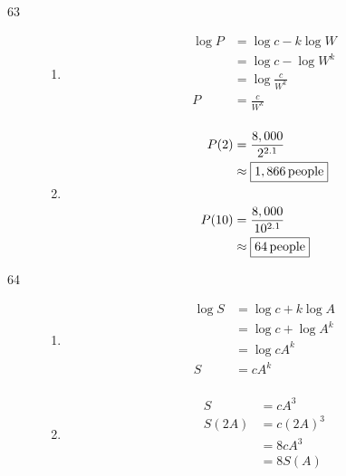 \documentclass{exam}
\begin{document}
\begin{description}
      \item[63]
        \begin{enumerate}[a]
          \item 
            \begin{align*}
              \log P &= \log c - k \log W \\
                     &= \log c - \log W^k \\
                     &= \log \frac{c}{W^k} \\
                   P &= \boxed{\frac{c}{W^k}} \\
            \end{align*}

          \item
            \begin{align*}
              P(2)  & = \frac{8,000}{2^{2.1}} \\
                    & \approx \boxed{\unit[1,866]{people}} \\
              \\
              P(10) & = \frac{8,000}{10^{2.1}} \\
                    & \approx \boxed{\unit[64]{people}} \\
            \end{align*}

        \end{enumerate}

      \item[64]
        \begin{enumerate}[a]
          \item 
            \begin{align*}
              \log S &= \log c + k \log A \\
                     &= \log c + \log A^k \\
                     &= \log cA^k \\
                   S &= \boxed{cA^k} \\
            \end{align*}

          \item
            \begin{align*}
              S     &= cA^3 \\
              S(2A) &= c (2A)^3 \\
                    &= 8 cA^3 \\
                    &= \boxed{8 S(A)} \\
            \end{align*}

        \end{enumerate}


    \end{description}
\end{document}
